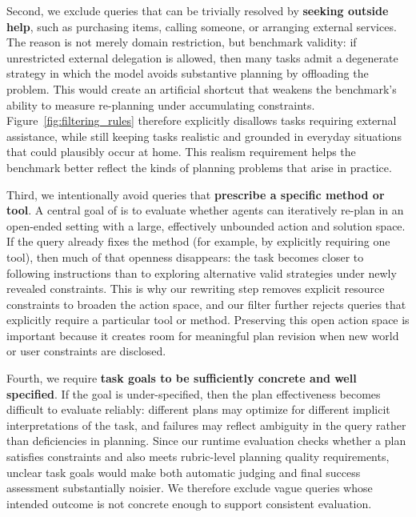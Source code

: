 Second, we exclude queries that can be trivially resolved by \textbf{seeking outside help}, such as purchasing items, calling someone, or arranging external services. 
The reason is not merely domain restriction, but benchmark validity: if unrestricted external delegation is allowed, then many tasks admit a degenerate strategy in which the model avoids substantive planning by offloading the problem. 
This would create an artificial shortcut that weakens the benchmark's ability to measure re-planning under accumulating constraints. 
Figure~\ref{fig:filtering_rules} therefore explicitly disallows tasks requiring external assistance, while still keeping tasks realistic and grounded in everyday situations that could plausibly occur at home. 
This realism requirement helps the benchmark better reflect the kinds of planning problems that arise in practice.

Third, we intentionally avoid queries that \textbf{prescribe a specific method or tool}. 
A central goal of \bench{} is to evaluate whether agents can iteratively re-plan in an open-ended setting with a large, effectively unbounded action and solution space. 
If the query already fixes the method (for example, by explicitly requiring one tool), then much of that openness disappears: the task becomes closer to following instructions than to exploring alternative valid strategies under newly revealed constraints.
This is why our rewriting step removes explicit resource constraints to broaden the action space, and our filter further rejects queries that explicitly require a particular tool or method. 
Preserving this open action space is important because it creates room for meaningful plan revision when new world or user constraints are disclosed.

Fourth, we require \textbf{task goals to be sufficiently concrete and well specified}. 
If the goal is under-specified, then the plan effectiveness becomes difficult to evaluate reliably: different plans may optimize for different implicit interpretations of the task, and failures may reflect ambiguity in the query rather than deficiencies in planning. 
Since our runtime evaluation checks whether a plan satisfies constraints and also meets rubric-level planning quality requirements, unclear task goals would make both automatic judging and final success assessment substantially noisier. 
We therefore exclude vague queries whose intended outcome is not concrete enough to support consistent evaluation.

